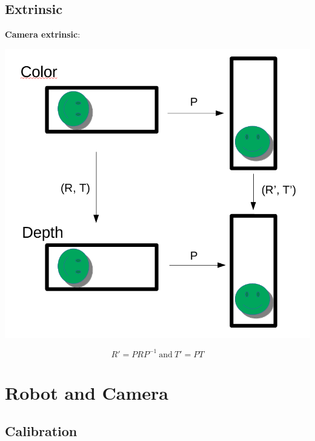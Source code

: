 \documentclass{beamer}
\begin{document}
\subsection{Extrinsic}

\begin{frame}
\textbf{Camera extrinsic}:
\begin{center}
\includegraphics[scale=0.2]{Pictures/CameraExtrinsicRotation.png}
\end{center}
\begin{equation}
R' = PRP^{-1}~ \text{and}~ T' = PT
\end{equation}
\end{frame}

\section{Robot and Camera}

\subsection{Calibration}
\end{document}
